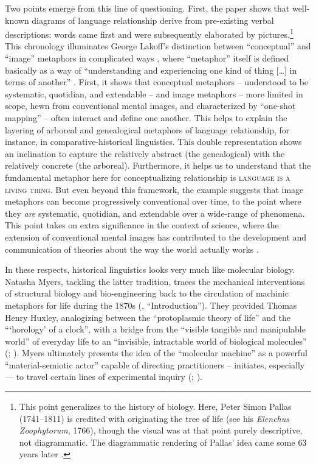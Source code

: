 \documentclass[output=paper]{langscibook}
\begin{document}
Two points emerge from this line of questioning. First, the paper shows that well-known diagrams of language relationship derive from pre-existing verbal descriptions: words came first and were subsequently elaborated by pictures.\footnote{This point generalizes to the history of biology. Here, Peter Simon Pallas (1741--1811) is credited with originating the tree of life (see his \emph{Elenchus Zoophytorum}, 1766), though the visual was at that point purely descriptive, not diagrammatic. The diagrammatic rendering of Pallas' idea came some 63 years later \citep{Eichwald1829}.} This chronology illuminates George Lakoff's distinction between ``conceptual'' and ``image'' metaphors in complicated ways \citep{Lakoff1987}, where ``metaphor'' itself is defined basically as a way of ``understanding and experiencing one kind of thing […] in terms of another'' \citep[455]{LakoffJohnson1980}. First, it shows that conceptual metaphors -- understood to be systematic, quotidian, and extendable -- and image metaphors -- more limited in scope, hewn from conventional mental images, and characterized by ``one-shot mapping'' -- often interact and define one another. This helps to explain the layering of arboreal and genealogical metaphors of language relationship, for instance, in comparative-historical linguistics. This double representation shows an inclination to capture the relatively abstract (the genealogical) with the relatively concrete (the arboreal). Furthermore, it helps us to understand that the fundamental metaphor here for conceptualizing relationship is \textsc{language is a living thing}. But even beyond this framework, the example suggests that image metaphors can become progressively conventional over time, to the point where they \emph{are} systematic, quotidian, and extendable over a wide-range of phenomena. This point takes on extra significance in the context of science, where the extension of conventional mental images has contributed to the development and communication of theories about the way the world actually works \citep[see][357]{Boyd1979}.

In these respects, historical linguistics looks very much like molecular biology. Natasha Myers, tackling the latter tradition, traces the mechanical interventions of structural biology and bio-engineering back to the circulation of machinic metaphors for life during the 1870s (\citealt{Myers2015}, ``Introduction''). They provided Thomas Henry Huxley, analogizing between the ``protoplasmic theory of life'' and the ```horology' of a clock'', with a bridge from the ``visible tangible and manipulable world'' of everyday life to an ``invisible, intractable world of biological molecules'' (\citealt{Huxley1880}; \citealt[157]{Myers2014}). Myers ultimately presents the idea of the ``molecular machine'' as a powerful ``material-semiotic actor'' capable of directing practitioners -- initiates, especially — to travel certain lines of experimental inquiry (\citealt{Haraway1991}; \citealt[165--168]{Myers2014}).
\end{document}
